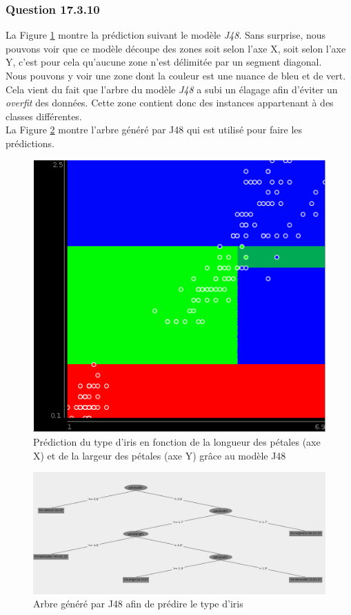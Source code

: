 \documentclass[10pt,a4paper]{article}
\begin{document}
			\subsubsection*{Question 17.3.10}
			
			La Figure \ref{fig:iris:J48} montre la prédiction suivant le modèle \textit{J48}. Sans surprise, nous pouvons voir que ce modèle découpe des zones soit selon l'axe X, soit selon l'axe Y, c'est pour cela qu'aucune zone n'est délimitée par un segment diagonal.\\
			
			Nous pouvons y voir une zone dont la couleur est une nuance de bleu et de vert. Cela vient du fait que l'arbre du modèle \textit{J48} a subi un élagage afin d'éviter un \textit{overfit} des données. Cette zone contient donc des instances appartenant à des classes différentes.\\
			
			La Figure \ref{fig:iris:J48:tree} montre l'arbre généré par J48 qui est utilisé pour faire les prédictions.
			
			\begin{figure}[h]
				\centering
				\includegraphics[width=.5\textwidth]{iris_J48}
				\caption{Prédiction du type d'iris en fonction de la longueur des pétales (axe X) et de la largeur des pétales (axe Y) grâce au modèle J48}
				\label{fig:iris:J48}
			\end{figure}
			
			\begin{figure}[h]
				\centering
				\includegraphics[width=.8\textwidth]{iris_J48_tree}
				\caption{Arbre généré par J48 afin de prédire le type d'iris}
				\label{fig:iris:J48:tree}
			\end{figure}
   	
\end{document}

